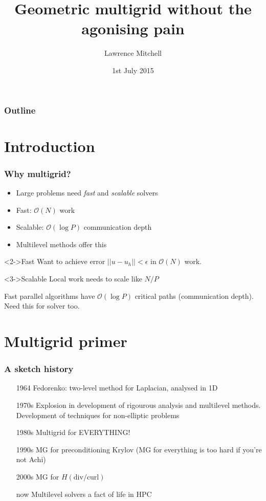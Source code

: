 \documentclass[presentation]{beamer}
\institute{Departments of Computing and Mathematics, Imperial College London}
\author{Lawrence Mitchell}
\date{1st July 2015}
\title{Geometric multigrid without the agonising pain}
\begin{document}
\maketitle

\begin{frame}
  \frametitle{Outline}
  \tableofcontents
\end{frame}

\section{Introduction}
\begin{frame}
  \frametitle{Why multigrid?}
  \begin{itemize}[<+->]
  \item Large problems need \emph{fast} and \emph{scalable} solvers
  \item Fast: $\mathcal{O}(N)$ work
  \item Scalable: $\mathcal{O}(\log P)$ communication depth
  \item Multilevel methods offer this
  \end{itemize}

  \begin{block}<2->{Fast}
    Want to achieve error $||u - u_h|| < \epsilon$ in $\mathcal{O}(N)$
    work.
  \end{block}

  \begin{block}<3->{Scalable}
    Local work needs to scale like $N/P$

    Fast parallel algorithms have $\mathcal{O}(\log P)$ critical paths
    (communication depth).  Need this for solver too.
  \end{block}
\end{frame}



\section{Multigrid primer}

\begin{frame}
  \frametitle{A sketch history}
  \begin{itemize}[<+->]
  \item[1964] Fedorenko: two-level method for Laplacian, analysed in
    1D
  \item[1970s] Explosion in development of rigourous analysis and
    multilevel methods.  Development of techniques for non-elliptic
    problems
  \item[1980s] Multigrid for EVERYTHING!
  \item[1990s] MG for preconditioning Krylov (MG for everything is too
    hard if you're not Achi)
  \item[2000s] MG for $H(\text{div}/\text{curl})$
  \item[now] Multilevel solvers a fact of life in HPC
  \end{itemize}
\end{frame}
\end{document}
